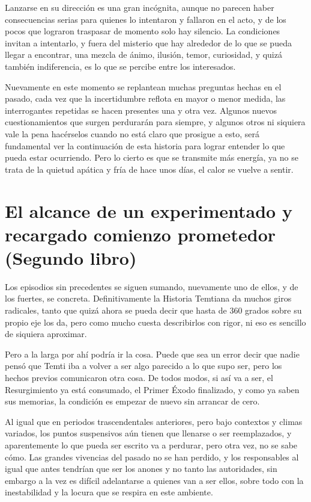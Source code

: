 \documentclass[
  spanish,
]{book}
\begin{document}
Lanzarse en su dirección es una gran incógnita, aunque no parecen haber consecuencias serias para quienes lo intentaron y fallaron en el acto, y de los pocos que lograron traspasar de momento solo hay silencio. La condiciones invitan a intentarlo, y fuera del misterio que hay alrededor de lo que se pueda llegar a encontrar, una mezcla de ánimo, ilusión, temor, curiosidad, y quizá también indiferencia, es lo que se percibe entre los interesados.

Nuevamente en este momento se replantean muchas preguntas hechas en el pasado, cada vez que la incertidumbre reflota en mayor o menor medida, las interrogantes repetidas se hacen presentes una y otra vez. Algunos nuevos cuestionamientos que surgen perdurarán para siempre, y algunos otros ni siquiera vale la pena hacérselos cuando no está claro que prosigue a esto, será fundamental ver la continuación de esta historia para lograr entender lo que pueda estar ocurriendo. Pero lo cierto es que se transmite más energía, ya no se trata de la quietud apática y fría de hace unos días, el calor se vuelve a sentir.

\hypertarget{el-alcance-de-un-experimentado-y-recargado-comienzo-prometedor-segundo-libro}{%
\chapter{El alcance de un experimentado y recargado comienzo prometedor (Segundo libro)}\label{el-alcance-de-un-experimentado-y-recargado-comienzo-prometedor-segundo-libro}}

Los episodios sin precedentes se siguen sumando, nuevamente uno de ellos, y de los fuertes, se concreta. Definitivamente la Historia Temtiana da muchos giros radicales, tanto que quizá ahora se pueda decir que hasta de 360 grados sobre su propio eje los da, pero como mucho cuesta describirlos con rigor, ni eso es sencillo de siquiera aproximar.

Pero a la larga por ahí podría ir la cosa. Puede que sea un error decir que nadie pensó que Temti iba a volver a ser algo parecido a lo que supo ser, pero los hechos previos comunicaron otra cosa. De todos modos, si así va a ser, el Resurgimiento ya está consumado, el Primer Éxodo finalizado, y como ya saben sus memorias, la condición es empezar de nuevo sin arrancar de cero.

Al igual que en periodos trascendentales anteriores, pero bajo contextos y climas variados, los puntos suspensivos aún tienen que llenarse o ser reemplazados, y aparentemente lo que pueda ser escrito va a perdurar, pero otra vez, no se sabe cómo. Las grandes vivencias del pasado no se han perdido, y los responsables al igual que antes tendrían que ser los anones y no tanto las autoridades, sin embargo a la vez es difícil adelantarse a quienes van a ser ellos, sobre todo con la inestabilidad y la locura que se respira en este ambiente.
\end{document}
